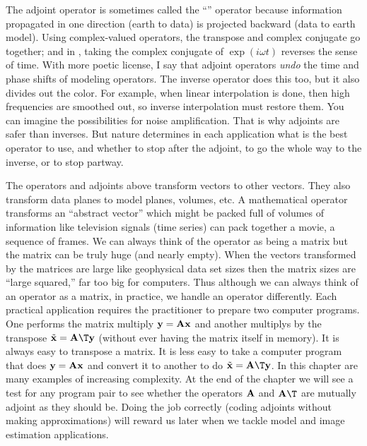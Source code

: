 \par
The adjoint operator is sometimes called
the ``'' operator
because information propagated in one direction (earth to data) is projected
backward (data to earth model).
Using complex-valued operators,
the transpose and complex conjugate go together;
and in , taking the complex conjugate
of $\exp(i\omega t)$ reverses the sense of time.
With more poetic license, I say that adjoint operators
{\em  undo}
the time and phase shifts of modeling operators.
The inverse operator does this too,
but it also divides out the color.
For example, when linear interpolation is done,
then high frequencies are smoothed out,
so inverse interpolation must restore them.
You can imagine the possibilities for noise amplification.
That is why adjoints are safer than inverses.
But nature determines in each application what is the best operator to use,
and whether to stop after the adjoint,
to go the whole way to the inverse,
or to stop partway.

\par 
The operators and adjoints above transform vectors to other vectors.
They also transform data planes to model planes, volumes, etc.
A mathematical operator transforms an ``abstract vector'' which
might be packed full of volumes of information like television
signals (time series) can pack together a movie, a sequence of frames.
We can always think of the operator as being a matrix
but the matrix can be truly huge (and nearly empty).
When the vectors transformed by the matrices are large like
geophysical data set sizes
then the matrix sizes are ``large squared,''
far too big for computers.
Thus although we can always think of an operator as a matrix,
in practice, we handle an operator differently.
Each practical application requires the practitioner to
prepare two computer programs.
One performs the matrix multiply
$\bold y =\bold A \bold x$
and another multiplys by the transpose
$\tilde{\bold x} =\bold A\T \bold y$
(without ever having the matrix itself in memory).
It is always easy to transpose a matrix.
It is less easy to take a computer program that does
$\bold y =\bold A \bold x$
and convert it to another to do
$\tilde{\bold x} =\bold A\T \bold y$.
In this chapter are many examples of increasing complexity.
At the end of the chapter we will see a test for any program pair
to see whether the operators $\bold A$ and $\bold A\T$ are mutually adjoint
as they should be.
Doing the job correctly (coding adjoints without making approximations)
will reward us later when we tackle model and image estimation applications.


